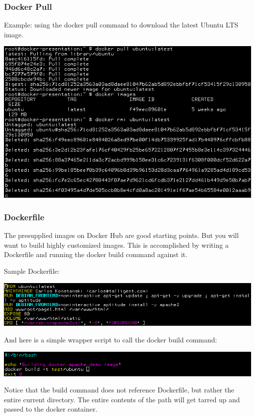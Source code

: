 \documentclass[helvetica,english,utf8,notitle,nologo]{beamer}
\begin{document}
\begin{frame}
  \frametitle{Docker Pull}

  Example: using the docker pull command to download the latest Ubuntu
  LTS image.

  \includegraphics[scale=0.48]{image_1}
\end{frame}

\begin{frame}
  \frametitle{Dockerfile}

  The presupplied images on Docker Hub are good starting points. But
  you will want to build highly customized images. This is
  accomplished by writing a Dockerfile and running the docker build
  command against it.

  Sample Dockerfile:

  \includegraphics[scale=0.44]{image_3}

  And here is a simple wrapper script to call the docker build command:

  \includegraphics[scale=0.455]{image_4}

  Notice that the build command does not reference Dockerfile, but
  rather the entire current directory. The entire contents of the path
  will get tarred up and passed to the docker container.
\end{frame}
\end{document}
